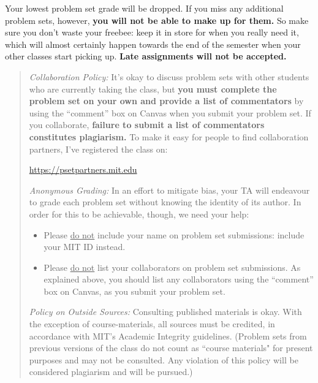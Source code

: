 \documentclass[11pt, a4paper]{article}
\begin{document}
Your lowest problem set grade will be dropped. If you miss any additional problem sets, however, \textbf{you will not be able to make up for them.} So make sure you don't waste your freebee: keep it in store for when you really need it, which will almost certainly happen towards the end of the semester when your other classes start picking up.  \textbf{Late assignments will not be accepted.} 




\begin{quote}

    

\emph{Collaboration Policy:} It's okay to discuss problem sets with other students who are currently taking the class, but \textbf{you must complete the problem set on your own and provide a list of commentators} by using the ``comment'' box on Canvas when you submit your problem set. If you collaborate, \textbf{failure to submit a list of commentators constitutes plagiarism.}
To make it easy for people to find collaboration partners, I've registered the class on:
\begin{center}
\url{https://psetpartners.mit.edu}
\end{center}

\vspace{2mm}

\emph{Anonymous Grading:} In an effort to mitigate bias, your TA will endeavour to grade each problem set without knowing the identity of its author. In order for this to be achievable, though, we need your help:

\begin{itemize}
    \item Please \underline{do not} include your name on problem set submissions: {include your MIT ID instead}.
    
    \item Please \underline{do not} list your collaborators on  problem set submissions. As explained above, you should list any collaborators using the ``comment'' box on Canvas, as you submit your problem set.
\end{itemize}

\vspace{2mm}



\emph{Policy on Outside Sources:} Consulting published materials is okay. With the exception of course-materials, all sources must be credited, in accordance with MIT's Academic Integrity guidelines. (Problem sets from previous versions of the class do not count as ``course materials" for present purposes and may not be consulted. Any violation of this policy will be considered plagiarism and will be  pursued.)

\end{quote}
\end{document}
